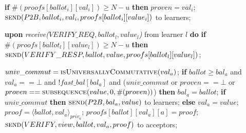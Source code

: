\begin{algorithm}
\begin{algorithmic}[1]
		\State \hspace{\algorithmicindent}\hspace{\algorithmicindent} \textbf{if} $\#(proofs[ballot_i][val_i]) \geq N-u$ \textbf{then}
		\State \hspace{\algorithmicindent}\hspace{\algorithmicindent} \hspace{\algorithmicindent} $proven = val_i$;
		\State \hspace{\algorithmicindent} \hspace{\algorithmicindent}\hspace{\algorithmicindent} $\Call{send}{P2B, ballot_i, val_i, proofs[ballot_i][value_i]}$ to learners;

		\State		
		\State \textbf{upon} \textit{receive($VERIFY\_REQ, ballot_l, value_l$)} from learner $l$ \textbf{do}
		\State \hspace{\algorithmicindent} \textbf{if} $\#(proofs[ballot_l][value_l]) \geq N-u$ \textbf{then}
		\State \hspace{\algorithmicindent}\hspace{\algorithmicindent} $\Call{send}{VERIFY\_RESP, ballot, value, proofs[ballot_l][value_l]}$;

		\State
		\State $univ\_commut = \Call{isUniversallyCommutative}{val_a}$;
		\State \textbf{if} $ballot \geq bal_a$ and $val_a == \bot$ and $!fast\_bal[bal_a]$ and ($univ\_commut$ or $proven == \bot$ or $proven == \Call{subsequence}{value, 0, \#(proven)}$) \textbf{then}
		\State \hspace{\algorithmicindent} $bal_a = ballot$;
		\State \hspace{\algorithmicindent} \textbf{if} $univ\_commut$ \textbf{then}
		\State \hspace{\algorithmicindent}\hspace{\algorithmicindent} $\Call{send}{P2B,bal_a, value}$ to learners;
		\State \hspace{\algorithmicindent} \textbf{else} 
		\State \hspace{\algorithmicindent}\hspace{\algorithmicindent} $val_a = value$;
		\State \hspace{\algorithmicindent}\hspace{\algorithmicindent} $proof = \langle ballot, val_a \rangle_{priv_a}$;
		\State \hspace{\algorithmicindent}\hspace{\algorithmicindent} $proofs[ballot][val_a][a] = proof$;
		\State \hspace{\algorithmicindent}\hspace{\algorithmicindent} $\Call{send}{VERIFY, view, ballot, val_a, proof}$ to acceptors;
		\EndFunction
		

\end{algorithmic}
\end{algorithm}
